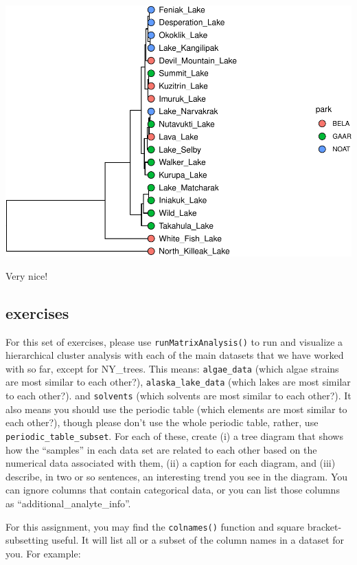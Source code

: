 \documentclass[
]{krantz}
\begin{document}
\begin{center}\includegraphics[width=0.8\linewidth]{index_files/figure-latex/unnamed-chunk-93-1} \end{center}

Very nice!

\hypertarget{exercises-3}{%
\subsection{exercises}\label{exercises-3}}

For this set of exercises, please use \texttt{runMatrixAnalysis()} to run and visualize a hierarchical cluster analysis with each of the main datasets that we have worked with so far, except for NY\_trees. This means: \texttt{algae\_data} (which algae strains are most similar to each other?), \texttt{alaska\_lake\_data} (which lakes are most similar to each other?). and \texttt{solvents} (which solvents are most similar to each other?). It also means you should use the periodic table (which elements are most similar to each other?), though please don't use the whole periodic table, rather, use \texttt{periodic\_table\_subset}. For each of these, create (i) a tree diagram that shows how the ``samples'' in each data set are related to each other based on the numerical data associated with them, (ii) a caption for each diagram, and (iii) describe, in two or so sentences, an interesting trend you see in the diagram. You can ignore columns that contain categorical data, or you can list those columns as ``additional\_analyte\_info''.

For this assignment, you may find the \texttt{colnames()} function and square bracket-subsetting useful. It will list all or a subset of the column names in a dataset for you. For example:
\end{document}

